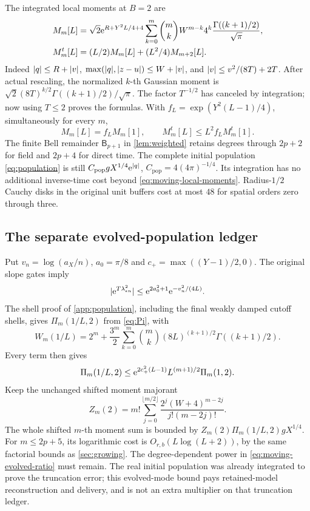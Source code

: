 The integrated local moments at \(B=2\) are
\begin{subequations}\label{eq:moving-local-moments}
\begin{align}
 M_m[L]&=\sqrt2\mathrm e^{R+Y^2L/4+4}
       \sum_{k=0}^m\binom{m}{k}W^{m-k}4^k
                  \frac{\Gamma((k+1)/2)}{\sqrt\pi},\\
 M_m^t[L]&=(L/2)M_m[L]+(L^2/4)M_{m+2}[L].
\end{align}
\end{subequations}
Indeed \(\lvert q\rvert\le R+\lvert v\rvert\),
\(\max(\lvert q\rvert,\lvert z-u\rvert)\le W+\lvert v\rvert\), and
\(\lvert v\rvert\le v^2/(8T)+2T\). After actual rescaling, the normalized
\(k\)-th Gaussian moment is
\(\sqrt2(8T)^{k/2}\Gamma((k+1)/2)/\sqrt\pi\).
The factor \(T^{-1/2}\) has canceled by integration; now using
\(T\le2\) proves the formulas. With
\(f_L=\exp(Y^2(L-1)/4)\), simultaneously for every \(m\),
\begin{equation}
 M_m[L]=f_LM_m[1],\qquad
 M_m^t[L]\le L^2f_LM_m^t[1].
 \label{eq:moving-local-ratios}
\end{equation}
The finite Bell remainder \(\mathsf B_{p+1}\) in
\cref{lem:weighted} retains degrees through \(2p+2\) for field and
\(2p+4\) for direct time. The complete initial population
\eqref{eq:population} is still
\(C_{\mathrm{pop}}gX^{1/4}\mathrm e^{|q|}\),
\(C_{\mathrm{pop}}=4(4\pi)^{-1/4}\). Its integration has no additional
inverse-time cost beyond \eqref{eq:moving-local-moments}.
Radius-\(1/2\) Cauchy disks in the original unit buffers cost at most
\(48\) for spatial orders zero through three.

\subsection{The separate evolved-population ledger}
\label{subsec:moving-population}
Put \(v_n=\log(a_X/n)\), \(a_0=\pi/8\) and
\(c_+=\max((Y-1)/2,0)\). The original slope gates imply
\[
 |\mathrm e^{T\lambda_{\epsilon n}^2}|
      \le\mathrm e^{2a_0^2+1}\mathrm e^{-v_n^2/(4L)}.
\]
The shell proof of \cref{app:population}, including the final weakly
damped cutoff shells, gives \(\Pi_m(1/L,2)\) from \eqref{eq:Pi}, with
\begin{equation}
 W_m(1/L)=2^m+\frac{3^m}{2}\sum_{k=0}^m\binom{m}{k}
                    (8L)^{(k+1)/2}\Gamma((k+1)/2).
 \label{eq:moving-shell-moments}
\end{equation}
Every term then gives
\begin{equation}
 \Pi_m(1/L,2)\le
   \mathrm e^{2c_+^2(L-1)}L^{(m+1)/2}\Pi_m(1,2).
 \label{eq:moving-evolved-ratio}
\end{equation}
Keep the unchanged shifted moment majorant
\[
 Z_m(2)=m!\sum_{j=0}^{\lfloor m/2\rfloor}
               \frac{2^j(W+4)^{m-2j}}{j!(m-2j)!}.
\]
The whole shifted \(m\)-th moment sum is bounded by
\(Z_m(2)\Pi_m(1/L,2)gX^{1/4}\). For \(m\le2p+5\), its logarithmic
cost is \(O_{r,b}(L\log(L+2))\), by the same factorial bounds as
\cref{sec:growing}. The degree-dependent power in
\eqref{eq:moving-evolved-ratio} must remain. The real initial population
was already integrated to prove the truncation error; this evolved-mode
bound pays retained-model reconstruction and delivery, and is not an
extra multiplier on that truncation ledger.

